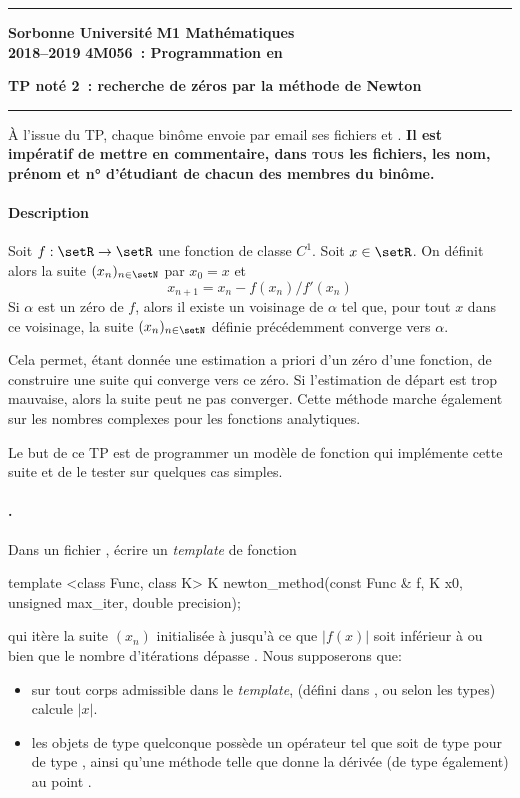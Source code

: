 \documentclass[10pt]{article}
\newcounter{questionnumber}
\newcommand{\question}{\stepcounter{questionnumber}\paragraph{\thequestionnumber.}}
\begin{document}
\hrule \vspace*{5pt} \noindent 
\textbf{Sorbonne Université} \hfill \textbf{M1 Mathématiques}\\
\textbf{2018--2019} \hfill \textbf{4M056~: Programmation en \CPP}
\begin{center}
\textbf{TP not\'e 2~: recherche de zéros par la méthode de Newton}
\end{center}
\hrule \vspace*{20pt}

À l'issue du TP, chaque binôme envoie par email ses fichiers  et .
\textbf{Il est imp\'eratif de mettre en commentaire, dans
\textsc{tous} les fichiers, les nom, pr\'enom et n° d'\'etudiant de chacun des
membres du bin\^ome.}

\paragraph{Description}
Soit $f:\setR\to\setR$ une fonction de classe $C^1$. Soit $x\in\setR$. On définit alors la suite $(x_n)_{n\in\setN}$ par $x_0=x$ et \[
x_{n+1} = x_n - f(x_n)/f'(x_n)
\]
Si $\alpha$ est un zéro de $f$, alors il existe un voisinage de $\alpha$ tel que, pour tout $x$ dans ce voisinage, la suite $(x_n)_{n\in\setN}$ définie précédemment converge vers $\alpha$.

Cela permet, étant donnée une estimation a priori d'un zéro d'une fonction, de construire une suite qui converge vers ce zéro. Si l'estimation de départ est trop mauvaise, alors la suite peut ne pas converger. Cette méthode marche également sur les nombres complexes pour les fonctions analytiques.

Le but de ce TP est de programmer un modèle de fonction qui implémente cette suite et de le tester sur quelques cas simples.

\question Dans un fichier , écrire un \emph{template} de fonction 
\begin{cppcode}
template <class Func, class K>
K newton_method(const Func & f, K x0, unsigned max_iter, double precision);
\end{cppcode}
qui itère la suite $(x_n)$ initialisée à  jusqu'à ce que $|f(x)|$ soit inférieur à  ou bien que le nombre d'itérations dépasse . Nous supposerons que:
\begin{itemize}
\item sur tout corps  admissible dans le \emph{template},  (défini dans ,  ou  selon les types) calcule $|x|$.
\item les objets  de type quelconque  possède un opérateur \src{()} tel que  soit de type  pour  de type , ainsi qu'une méthode  telle que  donne la dérivée (de type  également) au point .
\end{itemize}
\end{document}
